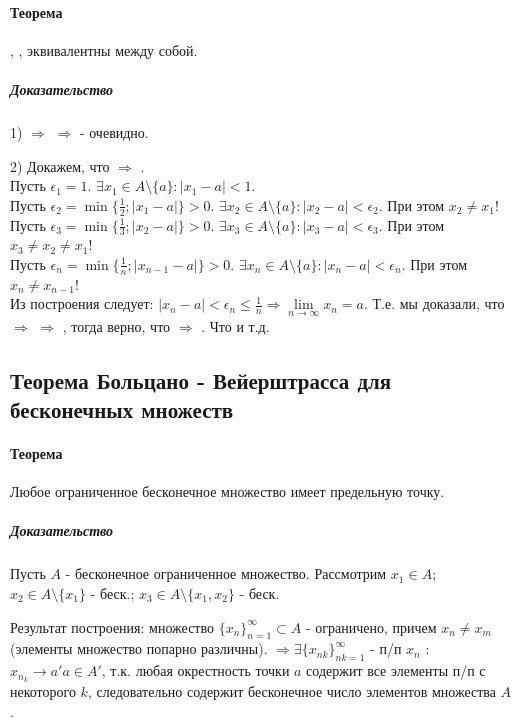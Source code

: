 \documentclass[10pt]{article}
\newcommand{\limninf}{\lim\limits_{n \to \infty}}
\newcommand{\seq}[2]{ \{#1_{#2}\}_{#2=1}^\infty}
\newcommand{\seqn}[1]{\seq{#1}{n}}
\begin{document}
			\paragraph{Теорема} , ,  эквивалентны между собой.
			\subparagraph{Доказательство} 1)  $\Rightarrow$  $\Rightarrow$  - очевидно.
			
			2) Докажем, что  $\Rightarrow$ .\\
			Пусть $\epsilon_1 = 1$. $\exists x_1 \in A \setminus \{a\} : |x_1 - a| < 1$.\\
			Пусть $\epsilon_2 = \min \{\frac{1}{2}; |x_1 - a|\} > 0$. $\exists x_2 \in A \setminus \{a\} : |x_2 - a| < \epsilon_2$. При этом $x_2 \neq x_1$!\\
			Пусть $\epsilon_3 = \min \{\frac{1}{3}; |x_2 - a|\} > 0$. $\exists x_3 \in A \setminus \{a\} : |x_3 - a| < \epsilon_3$. При этом $x_3 \neq x_2 \neq x_1$!\\
			Пусть $\epsilon_n = \min \{\frac{1}{n}; |x_{n-1} - a|\} > 0$. $\exists x_n \in A \setminus \{a\} : |x_n - a| < \epsilon_n$. При этом $x_n \neq x_{n-1}$!\\
			
			Из построения следует: $|x_n - a| < \epsilon_n \le \frac{1}{n} \Rightarrow \limninf x_n = a$. Т.е. мы доказали, что  $\Rightarrow$  $\Rightarrow$ , тогда верно, что  $\Rightarrow$ . Что и т.д.
		\subsection{Теорема Больцано - Вейерштрасса для бесконечных множеств}
			\paragraph{Теорема} Любое ограниченное бесконечное множество имеет предельную точку.
			\subparagraph{Доказательство}
			Пусть $A$ - бесконечное ограниченное множество. 
			Рассмотрим $x_1 \in A$; $x_2 \in A\setminus \{x_1\}$ - беск.; $x_3 \in A \setminus \{x_1, x_2\}$ - беск.
			
			Результат построения: множество $\seqn{x} \subset A$ - ограничено, причем $x_n \neq x_m$ (элементы множество попарно различны). $\Rightarrow \exists \seq{x}{nk}$ - п/п $x_n$ : $x_{n_k} \to a' a \in A'$, т.к. любая окрестность точки $a$ содержит все элементы п/п с некоторого $k$, следовательно содержит бесконечное число элементов множества $A$.
\end{document}
